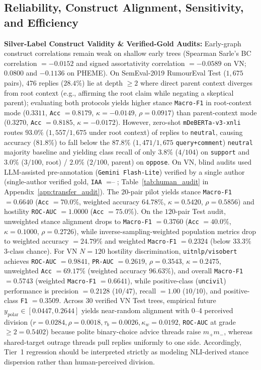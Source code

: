 \documentclass[conference]{IEEEtran}
\begin{document}
\subsection{Reliability, Construct Alignment, Sensitivity, and Efficiency}\label{sec:reliability}
\textbf{Silver-Label Construct Validity \& Verified-Gold Audits:} Early-graph construct correlations remain weak on shallow early trees (Spearman Sarle's BC correlation $= -0.0152$ and signed assortativity correlation $= -0.0589$ on VN; $0.0800$ and $-0.1136$ on PHEME). On SemEval-2019 RumourEval Test ($1{,}675$ pairs), $476$ replies ($28.4\%$) lie at depth $\ge 2$ where direct parent context diverges from root context (e.g., affirming the root claim while negating a skeptical parent); evaluating both protocols yields higher stance \texttt{Macro-F1} in root-context mode ($0.3311$, \texttt{Acc} $= 0.8179$, $\kappa = -0.0149$, $\rho = 0.0917$) than parent-context mode ($0.3270$, \texttt{Acc} $= 0.8185$, $\kappa = -0.0172$). However, zero-shot \texttt{mDeBERTa-v3-xnli} routes $93.0\%$ ($1{,}557/1{,}675$ under root context) of replies to \texttt{neutral}, causing accuracy ($81.8\%$) to fall below the $87.8\%$ ($1{,}471/1{,}675$ \texttt{query+comment}) \texttt{neutral} majority baseline and yielding class recall of only $3.8\%$ ($4/104$) on \texttt{support} and $3.0\%$ ($3/100$, root) / $2.0\%$ ($2/100$, parent) on \texttt{oppose}. On VN, blind audits used LLM-assisted pre-annotation (\texttt{Gemini Flash-Lite}) verified by a single author (single-author verified gold, \texttt{IAA} $= \text{--}$; Table~\ref{tab:human_audit} in Appendix~\ref{app:transfer_audit}). The $20$-pair pilot yields stance \texttt{Macro-F1} $= 0.6640$ (\texttt{Acc} $= 70.0\%$, weighted accuracy $64.78\%$, $\kappa = 0.5420$, $\rho = 0.5856$) and hostility \texttt{ROC-AUC} $= 1.0000$ (\texttt{Acc} $= 75.0\%$). On the $120$-pair Test audit, unweighted stance alignment drops to \texttt{Macro-F1} $= 0.3760$ (\texttt{Acc} $= 40.0\%$, $\kappa = 0.1000$, $\rho = 0.2726$), while inverse-sampling-weighted population metrics drop to weighted accuracy $= 24.79\%$ and weighted \texttt{Macro-F1} $= 0.2324$ (below $33.3\%$ 3-class chance). For VN $N=120$ hostility discrimination, \texttt{uitnlp/visobert} achieves \texttt{ROC-AUC} $= 0.9841$, \texttt{PR-AUC} $= 0.2619$, $\rho = 0.3543$, $\kappa = 0.2475$, unweighted \texttt{Acc} $= 69.17\%$ (weighted accuracy $96.63\%$), and overall \texttt{Macro-F1} $= 0.5743$ (weighted \texttt{Macro-F1} $= 0.6641$), while positive-class (\texttt{uncivil}) performance is precision $= 0.2128$ ($10/47$), recall $= 1.00$ ($10/10$), and positive-class \texttt{F1} $= 0.3509$. Across $30$ verified VN Test trees, empirical future $y_{\text{polar}} \in [0.0447, 0.2644]$ yields near-random alignment with 0--4 perceived division ($r = 0.0284, \rho = 0.0018, \tau_b = 0.0026, \kappa_w = 0.0192$, \texttt{ROC-AUC} at grade $\ge 2 = 0.5402$) because polite binary-choice advice threads raise $m_+ m_-$, whereas shared-target outrage threads pull replies uniformly to one side. Accordingly, Tier~1 regression should be interpreted strictly as modeling NLI-derived stance dispersion rather than human-perceived division.
\end{document}
